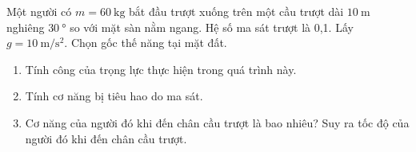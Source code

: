 \begin{ex}
	Một người có $m=\SI{60}{\kilogram}$ bắt đầu trượt xuống trên một cầu trượt dài $\SI{10}{\meter}$ nghiêng $\SI{30}{\degree}$ so với mặt sàn nằm ngang. Hệ số ma sát trượt là 0,1. Lấy $g=\SI{10}{\meter/\second^2}$. Chọn gốc thế năng tại mặt đất.
	\begin{enumerate}[label=\alph*)]
		\item Tính công của trọng lực thực hiện trong quá trình này.
		\item Tính cơ năng bị tiêu hao do ma sát.
		\item Cơ năng của người đó khi đến chân cầu trượt là bao nhiêu? Suy ra tốc độ của người đó khi đến chân cầu trượt.
	\end{enumerate}
\end{ex}
